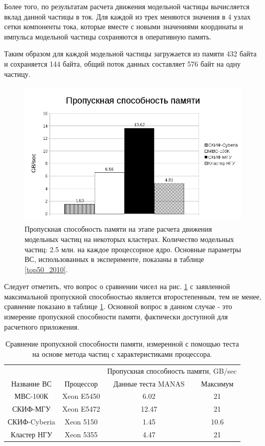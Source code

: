 Более того, по результатам расчета движения модельной частицы вычисляется вклад данной частицы в ток. Для каждой из трех меняются значения в 4 узлах сетки компоненты тока, которые вместе с новыми значениями координаты и импульса модельной частицы сохраняются в оперативную память.

Таким образом для каждой модельной частицы загружается из памяти 432 байта и сохраняется 144 байта, общий поток данных составляет 576 байт на одну частицу.




\begin{figure}[htb]
	\begin{center}
		\includegraphics[height=7cm,keepaspectratio]{images/data_proc_throughput_GBsec.png}
	\end{center}
	\caption{Пропускная способность памяти на этапе расчета движения модельных частиц на некоторых кластерах. Количество модельных частиц: 2.5 млн. на каждое процессорное ядро. Основные параметры ВС, использованных в эксперименте, показаны в таблице \ref{top50_2010}.}
	\label{PIC_RAM}
\end{figure}
Следует отметить, что вопрос о сравнении чисел на рис. \ref{PIC_RAM} с заявленной максимальной пропускной способностью 
является второстепенным, тем не менее, сравнение показано в таблице \ref{PIC_vs_PROC_RAM}. Основной вопрос в данном случае - это измерение пропускной способности памяти,  фактически доступной для расчетного приложения.

\begin{table}[ht]
\caption{Сравнение пропускной способности памяти, измеренной с помощью теста на основе метода частиц с характеристиками процессора.}
\label{PIC_vs_PROC_RAM}
\begin{tabular}{|c|c|c|c|}
	\hline
             &            & \multicolumn{2}{|c|}{Пропускная способность памяти, GB/sec} \\ \cline{3-4}  	
Название ВС  & Процессор  & Данные теста MANAS & Максимум \\ \hline
МВС-100К     & Xeon E5450 &     6.02           & 21       \\ \hline 
СКИФ-МГУ     & Xeon E5472 &     12.47          & 21       \\ \hline     
СКИФ-Cyberia & Xeon 5150  &     1.45           & 10.6     \\ \hline
Кластер НГУ  & Xeon 5355  &     4.47           & 21       \\ \hline
\end{tabular}	
\end{table}



